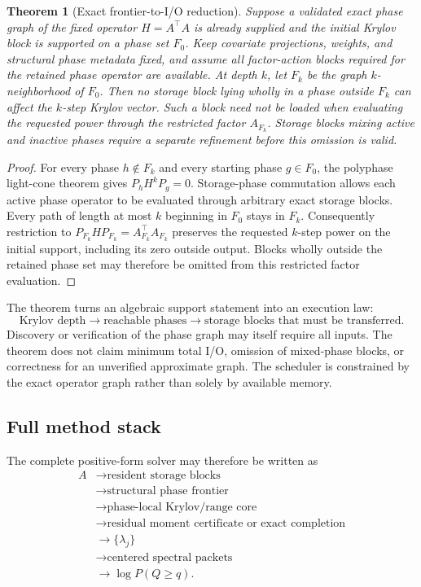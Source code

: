 \documentclass[11pt]{article}
\newtheorem{theorem}{Theorem}[section]
\theoremstyle{definition}
\theoremstyle{remark}
\begin{document}
\begin{theorem}[Exact frontier-to-I/O reduction]\label{claim:final-29-3}
Suppose a validated exact phase graph of the fixed operator $H=A^\top A$
is already supplied and the initial Krylov block is supported on a phase set
$F_0$.  Keep covariate projections, weights, and structural phase metadata
fixed, and assume all factor-action blocks required for the retained phase
operator are available.  At depth $k$, let $F_k$ be the graph
$k$-neighborhood of $F_0$.  Then no storage block lying wholly in a phase
outside $F_k$ can affect the $k$-step Krylov vector.  Such a block need not be
loaded when evaluating the requested power through the restricted factor
$A_{F_k}$.  Storage blocks mixing active and inactive phases require a
separate refinement before this omission is valid.
\end{theorem}

\begin{proof}
For every phase $h\notin F_k$ and every starting phase $g\in F_0$, the
polyphase light-cone theorem gives $P_hH^kP_g=0$.  Storage-phase commutation
allows each active phase operator to be evaluated through arbitrary exact
storage blocks.  Every path of length at most $k$ beginning in $F_0$ stays in $F_k$.
Consequently restriction to $P_{F_k}HP_{F_k}=A_{F_k}^\top A_{F_k}$ preserves
the requested $k$-step power on the initial support, including its zero
outside output.  Blocks wholly outside the retained phase set may therefore
be omitted from this restricted factor evaluation.
\end{proof}

The theorem turns an algebraic support statement into an execution law:
\[
\boxed{
\text{Krylov depth}
\longrightarrow
\text{reachable phases}
\longrightarrow
\text{storage blocks that must be transferred}.
}
\]
Discovery or verification of the phase graph may itself require all inputs.
The theorem does not claim minimum total I/O, omission of mixed-phase blocks,
or correctness for an unverified approximate graph.  The scheduler is constrained
by the exact operator graph rather than solely by available memory.

\subsection{Full method stack}

The complete positive-form solver may therefore be written as
\[
\boxed{\begin{aligned}
A
&\longrightarrow \text{resident storage blocks}\\
&\longrightarrow \text{structural phase frontier}\\
&\longrightarrow \text{phase-local Krylov/range core}\\
&\longrightarrow \text{residual moment certificate or exact completion}\\
&\longrightarrow \{\lambda_j\}\\
&\longrightarrow \text{centered spectral packets}\\
&\longrightarrow \log P(Q\ge q).
\end{aligned}}
\]
\end{document}
